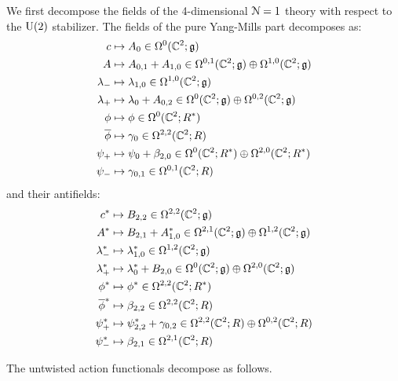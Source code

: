\documentclass[10pt, oneside]{article}
\begin{document}
We first decompose the fields of the 4-dimensional $\mathcal{N}=1$ theory with respect to the ${\rm U}(2)$ stabilizer.
The fields of the pure Yang-Mills part decomposes as:
\begin{align*}
c & \mapsto A_{0} \in \Omega^0(\mathbb C^2 ; \mathfrak g) \\
A & \mapsto A_{0,1} + A_{1,0} \in \Omega^{0,1}(\mathbb C^2 ; \mathfrak g) \oplus \Omega^{1,0}(\mathbb C^2 ; \mathfrak g) \\
\lambda_- & \mapsto \lambda_{1,0} \in \Omega^{1,0}(\mathbb C^2 ; \mathfrak g) \\
\lambda_+ & \mapsto \lambda_0 + A_{0,2} \in \Omega^{0}(\mathbb C^2 ; \mathfrak g) \oplus \Omega^{0,2}(\mathbb C^2 ; \mathfrak g) \\
\phi & \mapsto \phi \in \Omega^0 (\mathbb C^2 ; R^*) \\
\overline{\phi} & \mapsto \gamma_0 \in \Omega^{2,2}(\mathbb C^2 ; R) \\
\psi_+ & \mapsto \psi_0 + \beta_{2,0} \in \Omega^{0}(\mathbb C^2 ; R^*) \oplus \Omega^{2,0}(\mathbb C^2 ; R^*) \\
\psi_- & \mapsto \gamma_{0,1} \in \Omega^{0,1}(\mathbb C^2 ; R)
\end{align*}
and their antifields:
\begin{align*}
c^* & \mapsto B_{2,2} \in \Omega^{2,2}(\mathbb C^2 ; \mathfrak g) \\
A^* & \mapsto B_{2,1} + A^*_{1,0} \in \Omega^{2,1}(\mathbb C^2;\mathfrak g) \oplus \Omega^{1,2}(\mathbb C^2; \mathfrak g) \\
\lambda^*_- & \mapsto \lambda_{1,0}^* \in \Omega^{1,2}(\mathbb C^2 ; \mathfrak g) \\
\lambda^*_+ & \mapsto \lambda_0^*+ B_{2,0} \in \Omega^{0}(\mathbb C^2 ; \mathfrak g) \oplus \Omega^{2,0}(\mathbb C^2 ; \mathfrak g) \\
\phi^* & \mapsto \phi^* \in \Omega^{2,2}(\mathbb C^2 ; R^*) \\
\overline{\phi}^* & \mapsto \beta_{2,2} \in \Omega^{2,2} (\mathbb C^2 ; R) \\
\psi^*_+ & \mapsto \psi_{2,2}^* + \gamma_{0,2} \in \Omega^{2,2}(\mathbb C^2 ; R) \oplus \Omega^{0,2}(\mathbb C^2 ; R) \\
\psi^*_- & \mapsto \beta_{2,1} \in \Omega^{2,1}(\mathbb C^2 ; R)
\end{align*}

The untwisted action functionals decompose as follows.
\end{document}
